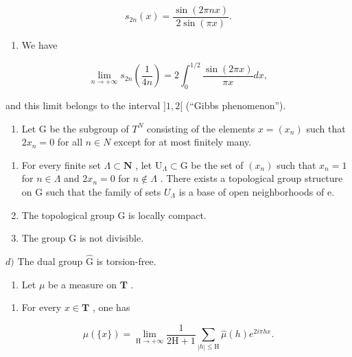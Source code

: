 \[
s _ {2 n} (x) = \frac {\sin (2 \pi n x)}{2 \sin (\pi x)}.
\]

\begin{enumerate}
\def\labelenumi{\alph{enumi})}
\setcounter{enumi}{2}
\tightlist
\item
  We have
\end{enumerate}

\[
\lim _ {n \rightarrow + \infty} s _ {2 n} \left(\frac {1}{4 n}\right) = 2 \int_ {0} ^ {1 / 2} \frac {\sin (2 \pi x)}{\pi x} d x,
\]

and this limit belongs to the interval \(]1,2[\) (“Gibbs phenomenon”).

\begin{enumerate}
\def\labelenumi{\arabic{enumi})}
\setcounter{enumi}{62}
\tightlist
\item
  Let G be the subgroup of \(T^{N}\) consisting of the elements \(x = (x_{n})\) such that \(2x_{n} = 0\) for all \(n \in N\) except for at most finitely many.
\end{enumerate}

\begin{enumerate}
\def\labelenumi{\alph{enumi})}
\item
  For every finite set \(\Lambda \subset \mathbf{N}\) , let \(\mathrm{U}_{\Lambda} \subset \mathrm{G}\) be the set of \((x_{n})\) such that \(x_{n} = 1\) for \(n \in \Lambda\) and \(2x_{n} = 0\) for \(n \notin \Lambda\) . There exists a topological group structure on G such that the family of sets \(U_{\Lambda}\) is a base of open neighborhoods of e.
\item
  The topological group G is locally compact.
\item
  The group G is not divisible.
\end{enumerate}

\(d)\) The dual group \(\widehat{\mathrm{G}}\) is torsion-free.

\begin{enumerate}
\def\labelenumi{\arabic{enumi})}
\setcounter{enumi}{63}
\tightlist
\item
  Let \(\mu\) be a measure on \(\mathbf{T}\) .
\end{enumerate}

\begin{enumerate}
\def\labelenumi{\alph{enumi})}
\tightlist
\item
  For every \(x \in \mathbf{T}\) , one has
\end{enumerate}

\[
\mu (\{x \}) = \lim _ {\mathrm{H} \rightarrow + \infty} \frac {1}{2 \mathrm{H} + 1} \sum_ {| h | \leqslant \mathrm{H}} \widehat {\mu} (h) e ^ {2 i \pi h x}.
\]

